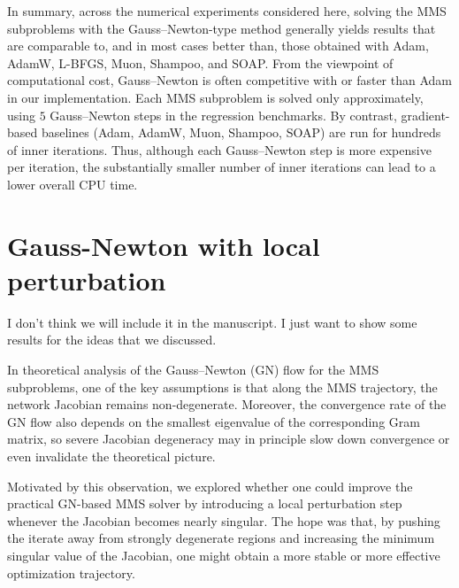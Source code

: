 \documentclass[twoside,11pt]{article}
\begin{document}
In summary, across the numerical experiments considered here, solving the MMS subproblems
with the Gauss--Newton-type method generally yields results that are comparable to, and in
most cases better than, those obtained with Adam, AdamW, L-BFGS, Muon, Shampoo, and SOAP. From the viewpoint of computational
cost, Gauss--Newton is often competitive with or faster than Adam in our implementation. Each MMS
subproblem is solved only approximately, using $5$ Gauss--Newton steps in the regression benchmarks. By contrast, gradient-based baselines (Adam, AdamW, Muon, Shampoo, SOAP) are run for hundreds of inner iterations.
Thus, although each Gauss--Newton step is more expensive per iteration, the substantially smaller number of inner
iterations can lead to a lower overall CPU time.

\iffalse
\section{Gauss-Newton with local perturbation}
{\color{red}I don't think we will include it in the manuscript. I just want to show some results for the ideas that we discussed.
}

In theoretical analysis of the Gauss--Newton (GN) flow for the MMS subproblems, one of the key assumptions is that along the MMS trajectory, the network Jacobian remains non-degenerate. Moreover, the convergence rate of the GN flow also depends on the smallest eigenvalue of the corresponding Gram matrix, so severe Jacobian degeneracy may in principle slow down convergence or even invalidate the theoretical picture.

Motivated by this observation, we explored whether one could improve the practical GN-based MMS solver by introducing a local perturbation step whenever the Jacobian becomes nearly singular. The hope was that, by pushing the iterate away from strongly degenerate regions and increasing the minimum singular value of the Jacobian, one might obtain a more stable or more effective optimization trajectory.
\end{document}
